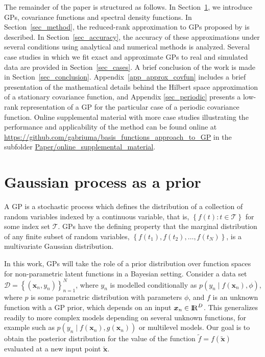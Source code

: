 The remainder of the paper is structured as follows. In Section~\ref{ch4_gp}, we introduce GPs, covariance functions and spectral density functions. In Section~\ref{sec_method}, the reduced-rank approximation to GPs proposed by \citet{solin2018hilbert} is described. In Section~\ref{sec_accuracy}, the accuracy of these approximations under several conditions using analytical and numerical methods is analyzed. Several case studies in which we fit exact and approximate GPs to real and simulated data are provided in Section~\ref{sec_cases}. A brief conclusion of the work is made in Section~\ref{sec_conclusion}. Appendix~\ref{app_approx_covfun} includes a brief presentation of the mathematical details behind the Hilbert space approximation of a stationary covariance function, and Appendix \ref{sec_periodic} presents a low-rank representation of a GP for the particular case of a periodic covariance function. Online supplemental material with more case studies illustrating the performance and applicability of the method can be found online at \url{https://github.com/gabriuma/basis_functions_approach_to_GP} in the subfolder \url{Paper/online_supplemental_material}.


\section{Gaussian process as a prior}\label{ch4_gp}

A GP is a stochastic process which defines the distribution of a collection of random variables indexed by a continuous variable, that is, $\left\lbrace f(t): t \in \mathcal{T}\right\rbrace$ for some index set $\mathcal{T}$. GPs have the defining property that the marginal distribution of any finite subset of random variables, $\left\lbrace f(t_1), f(t_2), \hdots, f(t_N) \right\rbrace$, is a multivariate Gaussian distribution.

In this work, GPs will take the role of a prior distribution over function spaces for non-parametric latent functions in a Bayesian setting. Consider a data set $\mathcal{D} = \left\lbrace (\bm{x}_n, y_n) \right\rbrace_{n=1}^N$, where $y_n$ is modelled conditionally as $p(y_n \mid f(\bm{x}_n),\phi)$, where $p$ is some parametric distribution with parameters  $\phi$, and $f$ is an unknown function with a GP prior, which depends on an input $\bm{x}_n\in {\rm I\!R}^D$. This generalizes readily to more complex models depending on several unknown functions, for example such as $p(y_n \mid f(\bm{x}_n),g(\bm{x}_n))$ or multilevel models. Our goal is to obtain the posterior distribution for the value of the function $\tilde{f}=f(\tilde{\bm{x}})$  evaluated at a new input point $\tilde{\bm{x}}$.

